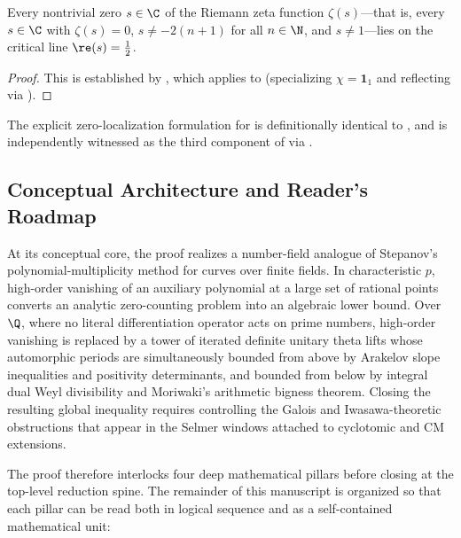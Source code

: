 \begin{corollary}
\label{cor:ch01-rh}
Every nontrivial zero $s \in \C$ of the Riemann zeta function $\zeta(s)$---that
is, every $s \in \C$ with $\zeta(s) = 0$, $s \neq -2(n+1)$ for all $n \in \N$,
and $s \neq 1$---lies on the critical line $\re(s) = \tfrac{1}{2}$.
\end{corollary}

\begin{proof}
This is established by , which applies
 to  (specializing
$\chi = \mathbf{1}_1$ and reflecting via ).
\end{proof}

\begin{remark}
\label{rem:ch01-rh-equiv}
The explicit zero-localization formulation 
for  is definitionally identical to
, and is independently witnessed as the third
component of  via .
\end{remark}

\subsection{Conceptual Architecture and Reader's Roadmap}
\label{subsec:ch01-roadmap}

At its conceptual core, the proof realizes a number-field analogue of
Stepanov's polynomial-multiplicity method for curves over finite fields.
In characteristic $p$, high-order vanishing of an auxiliary polynomial at a
large set of rational points converts an analytic zero-counting problem into an
algebraic lower bound.
Over $\Q$, where no literal differentiation operator acts on prime numbers,
high-order vanishing is replaced by a tower of iterated definite unitary theta
lifts whose automorphic periods are simultaneously bounded from above by
Arakelov slope inequalities and positivity determinants, and bounded from below
by integral dual Weyl divisibility and Moriwaki's arithmetic bigness theorem.
Closing the resulting global inequality requires controlling the Galois and
Iwasawa-theoretic obstructions that appear in the Selmer windows attached to
cyclotomic and CM extensions.

The proof therefore interlocks four deep mathematical pillars before closing at
the top-level reduction spine.
The remainder of this manuscript is organized so that each pillar can be read
both in logical sequence and as a self-contained mathematical unit:

